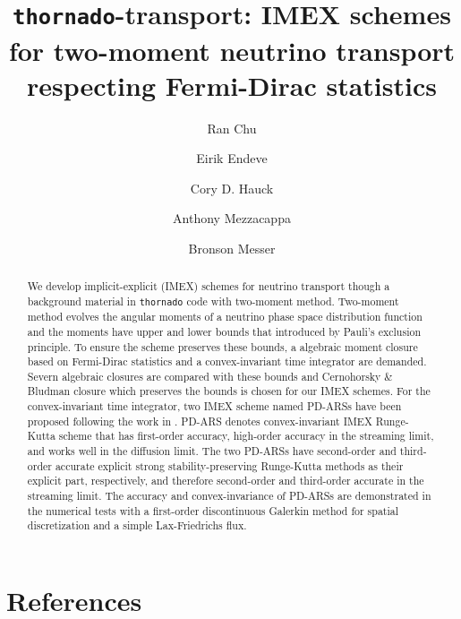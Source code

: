 \documentclass[a4paper]{jpconf}
\begin{document}
\title{\texttt{thornado}-transport: IMEX schemes for two-moment neutrino transport respecting Fermi-Dirac statistics}

\author{Ran Chu}
\address{Department of Physics and Astronomy, University of Tennessee Knoxville, TN 37996-1200}

\author{Eirik Endeve}
\address{Computational and Applied Mathematics Group, Oak Ridge National Laboratory, Oak Ridge, TN 37831 USA}
\address{Department of Physics and Astronomy, University of Tennessee Knoxville, TN 37996-1200}

\author{Cory D. Hauck}
\address{Computational and Applied Mathematics Group, Oak Ridge National Laboratory, Oak Ridge, TN 37831 USA}
\address{Department of Mathematics, University of Tennessee Knoxville, TN 37996-1320}

\author{Anthony Mezzacappa}
\address{Department of Physics and Astronomy, University of Tennessee Knoxville, TN 37996-1200}

\author{Bronson Messer}
\address{Scientific Computing and Theoretical Physics Groups, Oak Ridge National Laboratory, Oak Ridge, TN 37831 USA}
\address{Department of Physics and Astronomy, University of Tennessee Knoxville, TN 37996-1200}

\begin{abstract}
We develop implicit-explicit (IMEX) schemes for neutrino transport though a background material in \texttt{thornado} code with two-moment method.
Two-moment method evolves the angular moments of a neutrino phase space distribution function and the moments have upper and lower bounds that introduced by Pauli's exclusion principle.
To ensure the scheme preserves these bounds, a algebraic moment closure based on Fermi-Dirac statistics and a convex-invariant time integrator are demanded.
Severn algebraic closures are compared with these bounds and Cernohorsky \& Bludman closure\cite{cernohorskyBludman_1994} which preserves the bounds is chosen for our IMEX schemes.
For the convex-invariant time integrator, two IMEX scheme named PD-ARSs have been proposed following the work in \cite{chu_etal_2018}.
PD-ARS denotes convex-invariant IMEX Runge-Kutta scheme that has first-order accuracy, high-order accuracy in the streaming limit, and works well in the diffusion limit.
The two PD-ARSs have second-order and third-order accurate explicit strong stability-preserving Runge-Kutta methods\cite{gottlieb_etal_2001} as their explicit part, respectively, and therefore second-order and third-order accurate in the streaming limit.
The accuracy and convex-invariance of PD-ARSs are demonstrated in the numerical tests with a first-order discontinuous Galerkin method for spatial discretization and a simple Lax-Friedrichs flux.

\end{abstract}








\section*{References}

\end{document}
